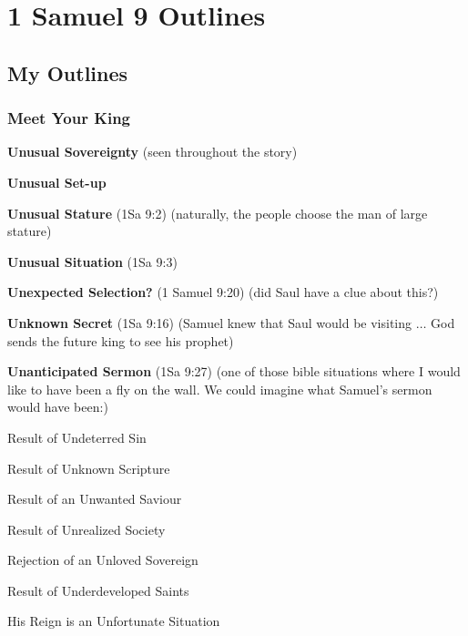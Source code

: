 \section{1 Samuel 9 Outlines}

\subsection{My Outlines}

\subsubsection{Meet Your King}
\begin{compactenum}[I.]
     \item \textbf{Unusual Sovereignty} (seen throughout the story)%
     \item \textbf{Unusual Set-up} 
   \item \textbf{Unusual Stature} (1Sa 9:2) (naturally, the people choose the man of large stature)
    \item \textbf{Unusual Situation} (1Sa 9:3) 
    \item \textbf{Unexpected Selection?} (1 Samuel 9:20) (did Saul have a clue about this?)
    \item \textbf{Unknown Secret} (1Sa 9:16) (Samuel knew that Saul would be visiting $\hdots$ God sends the future king to see his prophet)
    \item \textbf{Unanticipated Sermon} (1Sa 9:27) (one of those bible situations where I would like to have been a fly on the wall. We could imagine what Samuel's sermon would have been:)
    \begin{compactenum}[A.]
    	\item Result of Undeterred Sin
    	\item Result of Unknown Scripture
    	\item Result of an Unwanted Saviour
    	\item Result of Unrealized Society
    	\item Rejection of an Unloved Sovereign
    	\item Result of Underdeveloped Saints
    	\item His Reign is an Unfortunate Situation
    \end{compactenum}
\end{compactenum}
